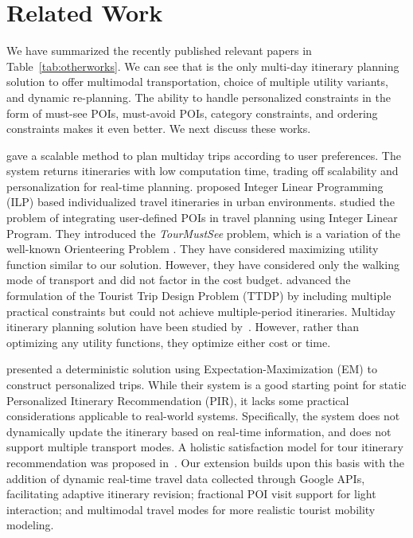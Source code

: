 \section{Related Work}
\label{Rel_Work}

We have summarized the recently published relevant papers in Table~\ref{tab:otherworks}. We can see that \trip is the only multi-day itinerary planning solution to offer multimodal transportation, choice of multiple utility variants, and dynamic re-planning. The ability to handle personalized constraints in the form of must-see POIs, must-avoid POIs, category constraints, and ordering constraints makes it even better. We next discuss these works.
 
\citet{chen2014automatic} gave a scalable method to plan multiday trips according to user preferences. The system returns itineraries with low computation time, trading off scalability and personalization for real-time planning. \citet{vanzelst2016itinerary} proposed Integer Linear Programming (ILP) based individualized travel itineraries in urban environments. \citet{taylor2018tour} studied the problem of integrating user-defined POIs in travel planning using Integer Linear Program. They introduced the \emph{TourMustSee} problem, which is a variation of the well-known Orienteering Problem \citep{golden1987orienteering}. They have considered maximizing utility function similar to our \emph{\trip} solution. However, they have considered only the walking mode of transport and did not factor in the cost budget. \citet{vu2022branch} advanced the formulation of the Tourist Trip Design Problem (TTDP) by including multiple practical constraints but could not achieve multiple-period itineraries. Multiday itinerary planning solution have been studied by~\citep{chen2014automatic,vanzelst2016itinerary,liu2024personalized,rambha2024optimized}. However, rather than optimizing any utility functions, they optimize either cost or time.  

\citet{panagiotakis2024expectation} presented a deterministic solution using Expectation-Maximization (EM) to construct personalized trips. While their system is a good starting point for static Personalized Itinerary Recommendation (PIR), it lacks some practical considerations applicable to real-world systems. Specifically, the system does not dynamically update the itinerary based on real-time information, and does not support multiple transport modes. A holistic satisfaction model for tour itinerary recommendation was proposed in~\citep{liu2024personalized}. Our extension builds upon this basis with the addition of dynamic real-time travel data collected through Google APIs, facilitating adaptive itinerary revision; fractional POI visit support for light interaction; and multimodal travel modes for more realistic tourist mobility modeling. 

